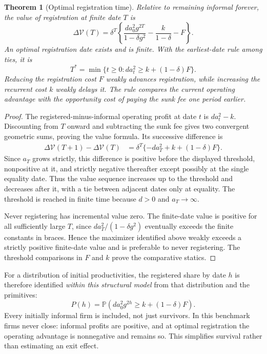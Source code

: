 \documentclass[11pt,a4paper]{article}
\newtheorem{theorem}{Theorem}[section]
\theoremstyle{definition}
\theoremstyle{remark}
\newcommand{\Prb}{\mathbb P}
\begin{document}
\begin{theorem}[Optimal registration time]\label{th:timing}
Relative to remaining informal forever, the value of registration at finite date $T$ is
\[
 \Delta\mathcal V(T)=\delta^T\left\{
 \frac{d a_0^2g^{2T}}{1-\delta g^2}
             -\frac{k}{1-\delta}-F\right\}.
\]
An optimal registration date exists and is finite. With the earliest-date rule among ties, it is
\[
 T^*=\min\{t\geq0:d a_t^2\geq k+(1-\delta)F\}.
\]
Reducing the registration cost $F$ weakly advances registration, while increasing the recurrent cost $k$ weakly delays it. The rule compares the current operating advantage with the opportunity cost of paying the sunk fee one period earlier.
\end{theorem}
\begin{proof}
The registered-minus-informal operating profit at date $t$ is $d a_t^2-k$. Discounting from $T$ onward and subtracting the sunk fee gives two convergent geometric sums, proving the value formula. Its successive difference is
\begin{align*}
 \Delta\mathcal V(T+1)-\Delta\mathcal V(T)
 &=\delta^T\{-d a_T^2+k+(1-\delta)F\}.
\end{align*}
Since $a_T$ grows strictly, this difference is positive before the displayed threshold, nonpositive at it, and strictly negative thereafter except possibly at the single equality date. Thus the value sequence increases up to the threshold and decreases after it, with a tie between adjacent dates only at equality. The threshold is reached in finite time because $d>0$ and $a_T\to\infty$.

Never registering has incremental value zero. The finite-date value is positive for all sufficiently large $T$, since $d a_T^2/(1-\delta g^2)$ eventually exceeds the finite constants in braces. Hence the maximizer identified above weakly exceeds a strictly positive finite-date value and is preferable to never registering. The threshold comparisons in $F$ and $k$ prove the comparative statics.
\end{proof}

For a distribution of initial productivities, the registered share by date $h$ is therefore identified \emph{within this structural model} from that distribution and the primitives:
\[
 P(h)=\Prb\left(d a_0^2g^{2h}\geq k+(1-\delta)F\right).
\]
Every initially informal firm is included, not just survivors. In this benchmark firms never close: informal profits are positive, and at optimal registration the operating advantage is nonnegative and remains so. This simplifies survival rather than estimating an exit effect.
\end{document}
